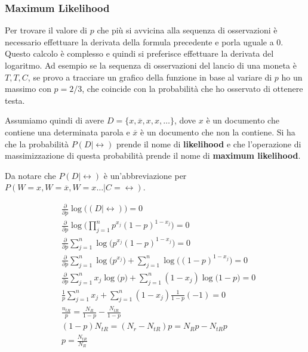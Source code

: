 
\subsubsection{Maximum Likelihood}

Per trovare il valore di $p$ che più si avvicina alla sequenza di osservazioni è necessario effettuare la derivata della formula precedente e porla uguale a 0. Questo calcolo è complesso e quindi si preferisce effettuare la derivata del logaritmo.
Ad esempio se la sequenza di osservazioni del lancio di una moneta è $T,T, C$, se provo a tracciare un grafico della funzione in base al variare di $p$ ho un massimo con $p = 2/3$, che coincide con la probabilità che ho osservato di ottenere testa.

Assumiamo quindi di avere $D = \{x, \overline{x}, x, x, \ldots \}$, dove $x$ è un documento che contiene una determinata parola e $\overline{x}$ è un documento che non la contiene.
Si ha che la probabilità $P(D|\rel)$ prende il nome di \textbf{likelihood} e che l'operazione di massimizzazione di questa probabilità prende il nome di \textbf{maximum likelihood}.

Da notare che $P(D|\rel)$ è un'abbreviazione per $P(W = x, W = \overline{x}, W = x \ldots | C = \rel)$.

\begin{align*}
	&\frac{\partial}{\partial p} \log \Big( (D|\rel) \Big) = 0\\
	&\frac{\partial}{\partial p} \log \Big( \prod\limits_{j = 1}^n p^{x_j}(1-p)^{1-x_j} \Big) = 0\\
	&\frac{\partial}{\partial p} \sum\limits_{j = 1}^n \log \Big( p^{x_j}(1-p)^{1-x_j} \Big) = 0 \\
	&\frac{\partial}{\partial p} \sum\limits_{j = 1}^n \log \Big( p^{x_j}\Big) + \sum\limits_{j = 1}^n \log \Big((1-p)^{1-x_j} \Big) = 0 \\
	&\frac{\partial}{\partial p} \sum\limits_{j = 1}^n x_j \log \Big( p\Big) + \sum\limits_{j = 1}^n (1-x_j)\log \Big(1-p \Big) = 0 \\
	&\frac{1}{p}\sum\limits_{j = 1}^n x_j + \sum\limits_{j = 1}^n (1-x_j) \frac{1}{1-p}(-1)= 0 \\
	&\frac{n_{tR}}{p}  =  \frac{N_R}{1-p} - \frac{N_{tR}}{1-p}\\
	&(1-p)N_{tR} = (N_r - N_{tR}) p  = N_Rp - N_{tR}p\\
	&\boxed{p = \frac{N_{tR}}{N_R}}
\end{align*}

